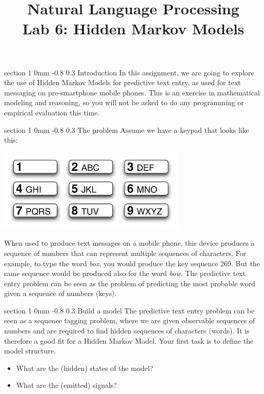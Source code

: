 \documentclass[11pt]{article}
\title{{\LARGE Natural Language Processing}\\[1.5mm]{\large Lab 6: Hidden Markov Models}}
\author{}
\date{} %
\makeatletter
\newcommand{\newsec}[2]{\section{#1}\label{sec:#2}\noindent}
\renewcommand{\section}{\@startsection
{section}%
{1}%
{0mm}%
{-0.8\baselineskip}%
{0.3\baselineskip}%
{\bfseries\large}}%
\makeatother
\begin{document}
 

\maketitle
\vspace{-2mm} \newsec{Introduction}{intro}%
In this assignment, we are going to explore the use of Hidden Markov
Models for predictive text entry, as used for text messaging on
pre-smartphone mobile phones.  This is an exercise in mathematical
modeling and reasoning, so you will not be asked to do any programming
or empirical evaluation this time.

\newsec{The problem}{problem}%
Assume we have a keypad that looks like this:
\begin{center}
\includegraphics[scale=0.5]{keypad.jpeg}
\end{center}
When used to produce text messages on a mobile phone, this device
produces a sequence of numbers that can represent multiple sequences
of characters.  For example, to type the word {\em box}, you would
produce the key sequence 269. But the same sequence would be produced
also for the word {\em bow}.  The predictive text entry problem can be
seen as the problem of predicting the most probable word given a
sequence of numbers (keys).

\newsec{Build a model}{model}%
The predictive text entry problem can be seen as a sequence tagging
problem, where we are given observable sequences of numbers and are
required to find hidden sequences of characters (words). It is therefore a
good fit for a Hidden Markov Model. Your first task is to define the
model structure.
\begin{itemize}[noitemsep,topsep=0.2cm]
\item What are the (hidden) states of the model?
\item What are the (emitted) signals?
\end{itemize}
\end{document}
